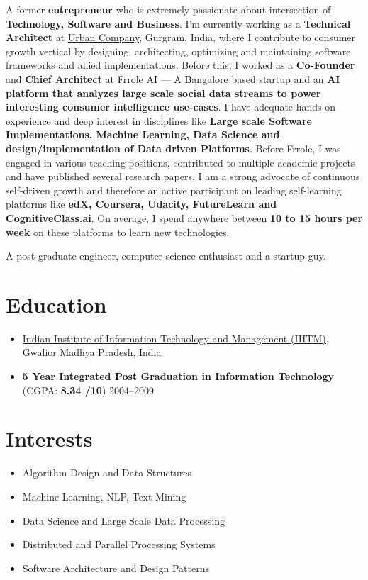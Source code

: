 \documentclass{article}
\begin{document}
\ifresearch
A former \textbf{entrepreneur} who is extremely passionate about intersection of \textbf{Technology, Software and Business}. I'm currently working as a \textbf{Technical Architect} at \href{https://www.urbancompany.com}{Urban Company}, Gurgram, India, where I contribute to consumer growth vertical by designing, architecting, optimizing and maintaining software frameworks and allied implementations. Before this, I worked as a \textbf{Co-Founder} and \textbf{Chief Architect} at \href{http://www.frrole.ai}{Frrole AI} --- A Bangalore based startup and an \textbf{AI platform that analyzes large scale social data streams to power interesting consumer intelligence use-cases}. I have adequate hands-on experience and deep interest in disciplines like \textbf{Large scale Software Implementations, Machine Learning, Data Science and design/implementation of Data driven Platforms}. Before Frrole, I was engaged in various teaching positions, contributed to multiple academic projects and have published several research papers. I am a strong advocate of continuous self-driven growth and therefore an active participant on leading self-learning platforms like \textbf{edX, Coursera, Udacity, FutureLearn and CognitiveClass.ai}. On average, I spend anywhere between \textbf{10 to 15 hours per week} on these platforms to learn new technologies.
\else

A post-graduate engineer, computer science enthusiast and a startup guy.  

\fi

\section{Education}
\begin{itemize}[leftmargin=-0.1ex]\setlength\itemsep{0.25em}\vspace{-10pt}
  \item[]  \href{http://iiitm.ac.in}{Indian Institute of Information Technology and Management (IIITM), Gwalior} \hfill Madhya Pradesh, India
  \item[] \textbf{5 Year Integrated Post Graduation in Information Technology} (CGPA: \textbf{8.34 /10}) \hfill 2004--2009
\end{itemize}\vspace{-3pt}

\section{Interests}
\begin{itemize}[leftmargin=-0.1ex]\setlength\itemsep{0.25em}\vspace{-10pt}
  \item Algorithm Design and Data Structures
  \item Machine Learning, NLP, Text Mining
  \item Data Science and Large Scale Data Processing
  \item Distributed and Parallel Processing Systems
  \item Software Architecture and Design Patterns
\end{itemize}\vspace{-3pt}
\end{document}
